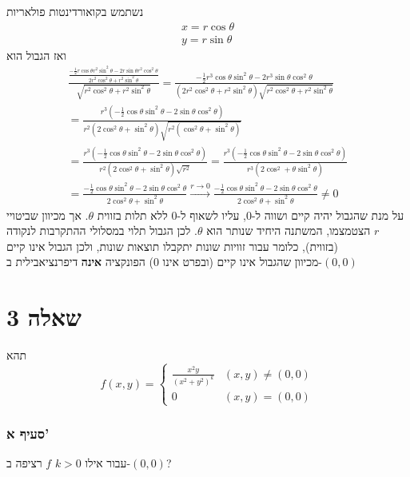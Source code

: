 \documentclass[12pt, titlepage]{article}
\begin{document}
נשתמש בקואורדינטות פולאריות
\begin{gather*}
    x = r \cos \theta \\
    y = r \sin \theta
\end{gather*}
ואז הגבול הוא
\begin{gather*}
    \frac{\frac{-\frac{1}{2}r\cos\theta r^2\sin ^2\theta  - 2 r\sin \theta r^2\cos^2\theta}{2r^2\cos^2\theta+ r^2\sin^2 \theta }}{\sqrt{r^2\cos^2\theta+ r^2\sin^2 \theta }} = \frac{-\frac{1}{2}r^3\cos\theta  \sin^2\theta - 2r^3 \sin \theta \cos^2 \theta}{\left(2r^2\cos^2\theta + r^2\sin^2\theta\right)\sqrt{r^2\cos^2\theta+r^2\sin^2\theta}} \\
    = \frac{r^3\left(-\frac{1}{2}\cos\theta\sin^2\theta-2\sin\theta\cos^2\theta\right) }{r^2\left(2\cos^2\theta+\sin^2\theta\right)\sqrt{r^2\left(\cos^2\theta+\sin^2\theta\right)}} \\
    = \frac{r^3\left(-\frac{1}{2}\cos\theta\sin^2\theta-2\sin\theta\cos^2\theta\right) }{r^2\left(2\cos^2\theta+\sin^2\theta\right)\sqrt{r^2}} = \frac{r^3\left(-\frac{1}{2}\cos\theta\sin^2\theta-2\sin\theta\cos^2\theta\right) }{r^3\left(2\cos^2+\theta\sin^2\theta\right)} \\
    = \frac{-\frac{1}{2}\cos\theta\sin^2\theta-2\sin\theta\cos^2\theta }{2\cos^2\theta+\sin^2\theta} \xrightarrow{r\to 0}\frac{-\frac{1}{2}\cos\theta\sin^2\theta-2\sin\theta\cos^2\theta }{2\cos^2\theta+\sin^2\theta} \neq 0
\end{gather*}
על מנת שהגבול יהיה קיים ושווה ל-$0$, עליו לשאוף ל-$0$ ללא תלות בזווית $\theta$. אך מכיוון שביטויי $r$ הצטמצמו, המשתנה היחיד שנותר הוא $\theta$. לכן הגבול תלוי במסלולי ההתקרבות לנקודה (בזווית), כלומר עבור זוויות שונות יתקבלו תוצאות שונות, ולכן הגבול אינו קיים\\
מכיוון שהגבול אינו קיים (ובפרט אינו $0$) הפונקציה \textbf{אינה} דיפרנציאבילית ב-$\left(0,0\right)$
\newpage
\part*{שאלה 3}
תהא
\[
    f\left(x,y\right) = \begin{cases}
    \frac{x^2y}{\left(x^2+y^2\right)^k} & \left(x,y\right) \neq \left(0,0\right)\\
        0 & \left(x,y\right) = \left(0,0\right)
    \end{cases}
\]
\section*{סעיף א'}
עבור אילו $k>0$ $f$ רציפה ב-$\left(0,0\right)$?
\end{document}
